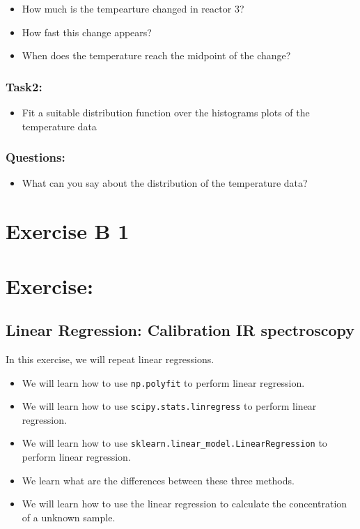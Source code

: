 \documentclass[
  letterpaper,
  DIV=11,
  numbers=noendperiod]{scrreprt}
\providecommand{\tightlist}{%
  \setlength{\itemsep}{0pt}\setlength{\parskip}{0pt}}\usepackage{longtable,booktabs,array}
\begin{document}
\begin{itemize}
\tightlist
\item
  How much is the tempearture changed in reactor 3?
\item
  How fast this change appears?
\item
  When does the temperature reach the midpoint of the change?
\end{itemize}

\subsection{Task2:}\label{task2}

\begin{itemize}
\tightlist
\item
  Fit a suitable distribution function over the histograms plots of the
  temperature data
\end{itemize}

\subsection{Questions:}\label{questions-2}

\begin{itemize}
\tightlist
\item
  What can you say about the distribution of the temperature data?
\end{itemize}

\chapter{Exercise B 1}\label{exercise-b-1}

\chapter{Exercise:}\label{exercise-1}

\section{Linear Regression: Calibration IR
spectroscopy}\label{linear-regression-calibration-ir-spectroscopy}

In this exercise, we will repeat linear regressions.

\begin{itemize}
\item
  We will learn how to use \texttt{np.polyfit} to perform linear
  regression.
\item
  We will learn how to use \texttt{scipy.stats.linregress} to perform
  linear regression.
\item
  We will learn how to use
  \texttt{sklearn.linear\_model.LinearRegression} to perform linear
  regression.
\item
  We learn what are the differences between these three methods.
\item
  We will learn how to use the linear regression to calculate the
  concentration of a unknown sample.
\end{itemize}
\end{document}
